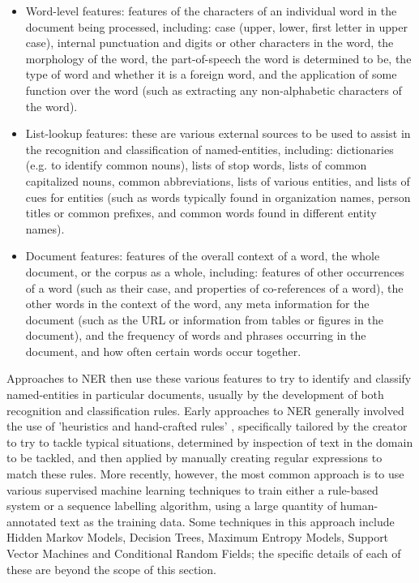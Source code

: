 \documentclass[12pt, a4paper]{report}
\begin{document}
\begin{itemize}
	\item {Word-level features: features of the characters of an individual word in the document being processed, including: case (upper, lower, first letter in upper case), internal punctuation and digits or other characters in the word, the morphology of the word, the part-of-speech the word is determined to be, the type of word and whether it is a foreign word, and the application of some function over the word (such as extracting any non-alphabetic characters of the word).}
	\item {List-lookup features: these are various external sources to be used to assist in the recognition and classification of named-entities, including: dictionaries (e.g. to identify common nouns), lists of stop words, lists of common capitalized nouns, common abbreviations, lists of various entities, and lists of cues for entities (such as words typically found in organization names, person titles or common prefixes, and common words found in different entity names).}
	\item {Document features: features of the overall context of a word, the whole document, or the corpus as a whole, including: features of other occurrences of a word (such as their case, and properties of co-references of a word), the other words in the context of the word, any meta information for the document (such as the URL or information from tables or figures in the document), and the frequency of words and phrases occurring in the document, and how often certain words occur together.}
\end{itemize}

Approaches to NER then use these various features to try to identify and classify named-entities in particular documents, usually by the  development of both recognition and classification rules. Early approaches to NER generally involved the use of 'heuristics and hand-crafted rules' \citep[p.~2]{nadeau2009}, specifically tailored by the creator to try to tackle typical situations, determined by inspection of text in the domain to be tackled, and then applied by manually creating regular expressions to match these rules. More recently, however, the most common approach is to use various supervised machine learning techniques to train either a rule-based system or a sequence labelling algorithm, using a large quantity of human-annotated text as the training data. Some techniques in this approach include Hidden Markov Models, Decision Trees, Maximum Entropy Models, Support Vector Machines and Conditional Random Fields; the specific details of each of these are beyond the scope of this section. %
\end{document}

